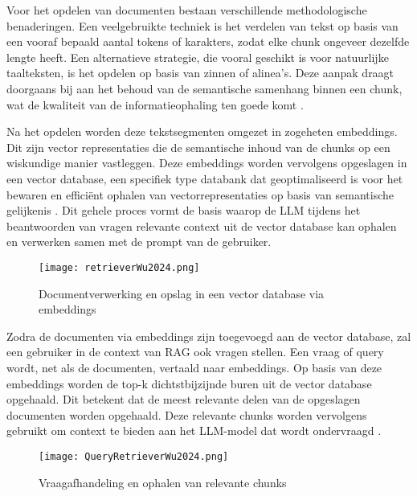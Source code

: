     Voor het opdelen van documenten bestaan verschillende methodologische benaderingen. Een veelgebruikte techniek is het verdelen van tekst op basis van een vooraf bepaald aantal tokens of karakters, zodat elke chunk ongeveer dezelfde lengte heeft. Een alternatieve strategie, die vooral geschikt is voor natuurlijke taalteksten, is het opdelen op basis van zinnen of alinea's. Deze aanpak draagt doorgaans bij aan het behoud van de semantische samenhang binnen een chunk, wat de kwaliteit van de informatieophaling ten goede komt \autocite{wang2024searchingbestpracticesretrievalaugmented}.
    
    Na het opdelen worden deze tekstsegmenten omgezet in zogeheten embeddings. Dit zijn vector representaties die de semantische inhoud van de chunks op een wiskundige manier vastleggen. Deze embeddings worden vervolgens opgeslagen in een vector database, een specifiek type databank dat geoptimaliseerd is voor het bewaren en efficiënt ophalen van vectorrepresentaties op basis van semantische gelijkenis \autocite{wu2025retrievalaugmentedgenerationnaturallanguage}. Dit gehele proces vormt de basis waarop de LLM tijdens het beantwoorden van vragen relevante context uit de vector database kan ophalen en verwerken samen met de prompt van de gebruiker. %
   
     \begin{figure}[H]
        \centering
        \texttt{[image: retrieverWu2024.png]}
        \caption{Documentverwerking en opslag in een vector database via embeddings \autocite{wu2025retrievalaugmentedgenerationnaturallanguage}}
        \label{fig:RAG opmaken vector database}
    \end{figure}
    
    Zodra de documenten via embeddings zijn toegevoegd aan de vector database, zal een gebruiker in de context van RAG ook vragen stellen. Een vraag of query wordt, net als de documenten, vertaald naar embeddings. Op basis van deze embeddings worden de top-k dichtstbijzijnde buren uit de vector database opgehaald. Dit betekent dat de meest relevante delen van de opgeslagen documenten worden opgehaald. Deze relevante chunks worden vervolgens gebruikt om context te bieden aan het LLM-model dat wordt ondervraagd \autocite{wu2025retrievalaugmentedgenerationnaturallanguage}.
    
            
    \begin{figure}[H]
        \centering
        \texttt{[image: QueryRetrieverWu2024.png]}
        \caption{Vraagafhandeling en ophalen van relevante chunks \autocite{wu2025retrievalaugmentedgenerationnaturallanguage}}
        \label{fig:RAG bevragen vector database}
    \end{figure}
    
